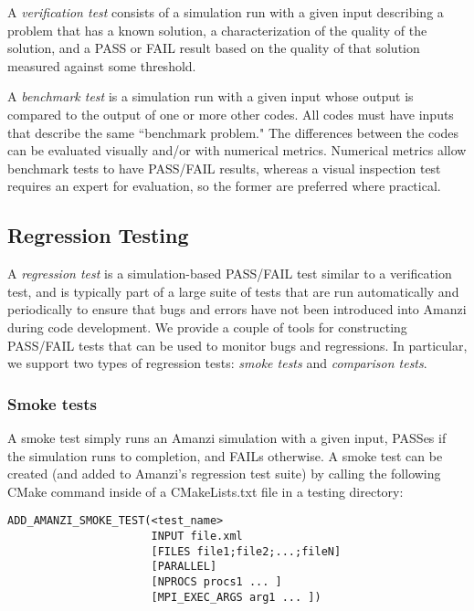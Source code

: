 A {\em verification test} consists of a simulation run with a given input describing 
a problem that has a known solution, a characterization of the quality of the 
solution, and a PASS or FAIL result based on the quality of that solution measured 
against some threshold. 


A {\em benchmark test} is a simulation run with a given input whose output is 
compared to the output of one or more other codes. All codes must have inputs that 
describe the same ``benchmark problem." The differences between the codes can be 
evaluated visually and/or with numerical metrics. Numerical metrics allow benchmark 
tests to have PASS/FAIL results, whereas a visual inspection test requires an 
expert for evaluation, so the former are preferred where practical.



\subsection{Regression Testing}
A {\em regression test} is a simulation-based PASS/FAIL test similar to a 
verification test, and is typically part of a large suite of tests that are run 
automatically and periodically to ensure that bugs and errors have not been 
introduced into Amanzi during code development. We provide a couple of tools for 
constructing PASS/FAIL tests that can be used to monitor bugs and regressions. In 
particular, we support two types of regression tests: {\em smoke tests} and 
{\em comparison tests}.

\subsubsection{Smoke tests}
A smoke test simply runs an Amanzi simulation with a given input, PASSes if 
the simulation runs to completion, and FAILs otherwise. A smoke test can be created
(and added to Amanzi's regression test suite) by calling the following CMake command 
inside of a CMakeLists.txt file in a testing directory:

\begin{lstlisting}
ADD_AMANZI_SMOKE_TEST(<test_name> 
                      INPUT file.xml
                      [FILES file1;file2;...;fileN]
                      [PARALLEL] 
                      [NPROCS procs1 ... ]
                      [MPI_EXEC_ARGS arg1 ... ])
\end{lstlisting}

